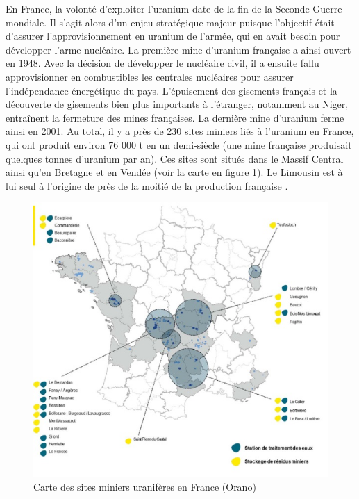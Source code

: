 \documentclass{article}
\begin{document}
En France, la volonté d’exploiter l’uranium date de la fin de la Seconde Guerre mondiale. Il s’agit alors d’un enjeu stratégique majeur puisque l’objectif était d’assurer l’approvisionnement en uranium de l’armée, qui en avait besoin pour développer l’arme nucléaire. La première mine d’uranium française a ainsi ouvert en 1948. Avec la décision de développer le nucléaire civil, il a ensuite fallu approvisionner en combustibles les centrales nucléaires pour assurer l’indépendance énergétique du pays. L’épuisement des gisements français et la découverte de gisements bien plus importants à l’étranger, notamment au Niger, entraînent la fermeture des mines françaises. La dernière mine d’uranium ferme ainsi en 2001. Au total, il y a près de 230 sites miniers liés à l’uranium en France, qui ont produit environ 76 000 t en un demi-siècle (une mine française produisait quelques tonnes d’uranium par an). Ces sites sont situés dans le Massif Central ainsi qu’en Bretagne et en Vendée (voir la carte en figure \ref{fig:sites_orano}). Le Limousin est à lui seul à l’origine de près de la moitié de la production française \cite{descostes_introduction_2020}.

\begin{figure}[!h]
    \centering
    \includegraphics[width=\linewidth]{I_A_2.jpg}
    \caption{Carte des sites miniers uranifères en France (Orano)}
    \label{fig:sites_orano}
\end{figure}
\end{document}
